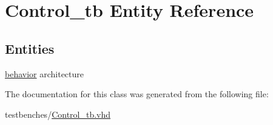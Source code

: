 \hypertarget{class_control__tb}{\section{\-Control\-\_\-tb \-Entity \-Reference}
\label{class_control__tb}
}
\subsection*{\-Entities}
\begin{DoxyCompactItemize}
\item 
\hyperlink{class_control__tb_1_1behavior}{behavior} architecture
\end{DoxyCompactItemize}


\-The documentation for this class was generated from the following file\-:\begin{DoxyCompactItemize}
\item 
testbenches/\hyperlink{_control__tb_8vhd}{\-Control\-\_\-tb.\-vhd}\end{DoxyCompactItemize}

